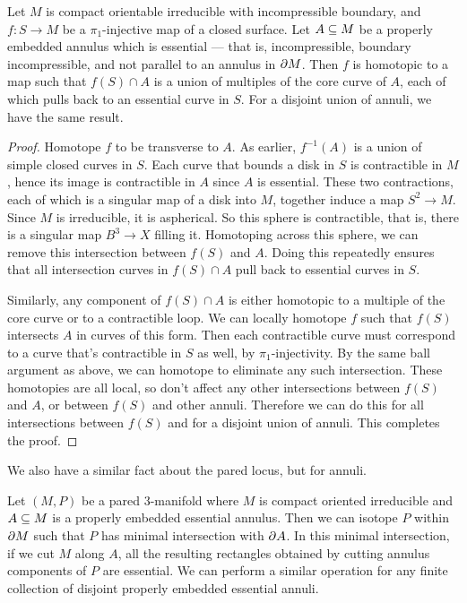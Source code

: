 \begin{prop}

Let $M$ is compact orientable irreducible with incompressible boundary, and $f
\colon S \to M$ be a $\pi_1$-injective map of a closed surface. Let $A \subseteq M$
be a properly embedded annulus which is essential --- that is, incompressible,
boundary incompressible, and not parallel to an annulus in $\partial M$. Then $f$ is
homotopic to a map such that $f(S) \cap A$ is a union of multiples of the core
curve of $A$, each of which pulls back to an essential curve in $S$. For
a disjoint union of annuli, we have the same result.

\end{prop}

\begin{proof}

Homotope $f$ to be transverse to $A$. As earlier, $f^{-1}(A)$ is a union of
simple closed curves in $S$. Each curve that bounds a disk in $S$ is
contractible in $M$, hence its image is contractible in $A$ since $A$ is
essential.  These two contractions, each of which is a singular map of a disk
into $M$, together induce a map $S^2 \to M$. Since $M$ is irreducible, it is
aspherical. So this sphere is contractible, that is, there is a singular map
$B^3 \to X$ filling it. Homotoping across this sphere, we can remove this
intersection between $f(S)$ and $A$. Doing this repeatedly ensures that all
intersection curves in $f(S) \cap A$ pull back to essential curves in $S$.

Similarly, any component of $f(S) \cap A$ is either homotopic to a multiple of
the core curve or to a contractible loop. We can locally homotope $f$ such that
$f(S)$ intersects $A$ in curves of this form. Then each contractible curve must
correspond to a curve that's contractible in $S$ as well, by
$\pi_1$-injectivity.  By the same ball argument as above, we can homotope to
eliminate any such intersection. These homotopies are all local, so don't
affect any other intersections between $f(S)$ and $A$, or between $f(S)$ and
other annuli. Therefore we can do this for all intersections between $f(S)$ and
for a disjoint union of annuli. This completes the proof.

\end{proof}

We also have a similar fact about the pared locus, but for annuli.

\begin{prop}

Let $(M,P)$ be a pared $3$-manifold where $M$ is compact oriented irreducible
and $A \subseteq M$ is a properly embedded essential annulus. Then we can isotope
$P$ within $\partial M$ such that $P$ has minimal intersection with $\partial A$.  In
this minimal intersection, if we cut $M$ along $A$, all the resulting
rectangles obtained by cutting annulus components of $P$ are essential.  We can
perform a similar operation for any finite collection of disjoint properly
embedded essential annuli.

\end{prop}

